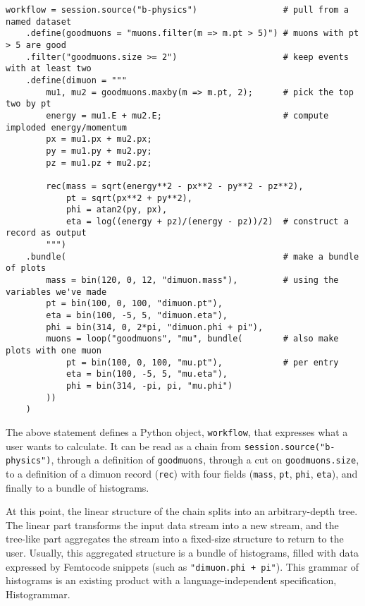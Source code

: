 \documentclass{article}
\begin{document}
\begin{verbatim}
workflow = session.source("b-physics")                 # pull from a named dataset
    .define(goodmuons = "muons.filter(m => m.pt > 5)") # muons with pt > 5 are good
    .filter("goodmuons.size >= 2")                     # keep events with at least two
    .define(dimuon = """
        mu1, mu2 = goodmuons.maxby(m => m.pt, 2);      # pick the top two by pt
        energy = mu1.E + mu2.E;                        # compute imploded energy/momentum
        px = mu1.px + mu2.px;
        py = mu1.py + mu2.py;
        pz = mu1.pz + mu2.pz;

        rec(mass = sqrt(energy**2 - px**2 - py**2 - pz**2),
            pt = sqrt(px**2 + py**2),
            phi = atan2(py, px),
            eta = log((energy + pz)/(energy - pz))/2)  # construct a record as output
        """)
    .bundle(                                           # make a bundle of plots
        mass = bin(120, 0, 12, "dimuon.mass"),         # using the variables we've made
        pt = bin(100, 0, 100, "dimuon.pt"),
        eta = bin(100, -5, 5, "dimuon.eta"),
        phi = bin(314, 0, 2*pi, "dimuon.phi + pi"),
        muons = loop("goodmuons", "mu", bundle(        # also make plots with one muon
            pt = bin(100, 0, 100, "mu.pt"),            # per entry
            eta = bin(100, -5, 5, "mu.eta"),
            phi = bin(314, -pi, pi, "mu.phi")
        ))
    )
\end{verbatim}

The above statement defines a Python object, {\tt workflow}, that expresses what a user wants to calculate. It can be read as a chain from {\tt session.source("b-physics")}, through a definition of {\tt goodmuons}, through a cut on {\tt goodmuons.size}, to a definition of a dimuon record ({\tt rec}) with four fields ({\tt mass}, {\tt pt}, {\tt phi}, {\tt eta}), and finally to a bundle of histograms.

At this point, the linear structure of the chain splits into an arbitrary-depth tree. The linear part transforms the input data stream into a new stream, and the tree-like part aggregates the stream into a fixed-size structure to return to the user. Usually, this aggregated structure is a bundle of histograms, filled with data expressed by Femtocode snippets (such as {\tt "dimuon.phi + pi"}). This grammar of histograms is an existing product with a language-independent specification, Histogrammar\footnotemark.

\end{document}
